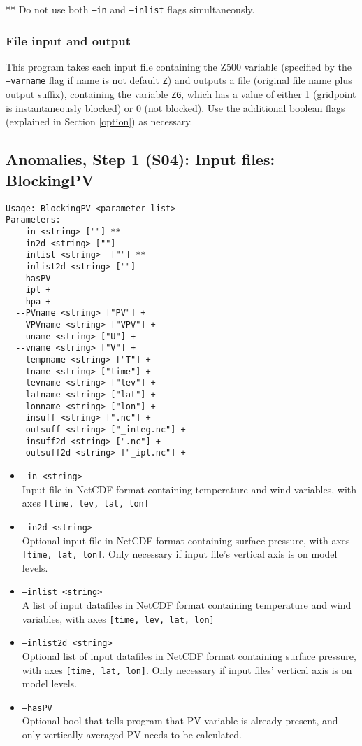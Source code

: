 \documentclass{article}
\begin{document}
** Do not use both \texttt{--in} and \texttt{--inlist} flags simultaneously.


\subsubsection{File input and output}


This program takes each input file containing the Z500 variable (specified by the \texttt{--varname} flag if name is not default \texttt{Z}) and outputs a file (original file name plus output suffix), containing the variable \texttt{ZG}, which has a value of either 1 (gridpoint is instantaneously blocked) or 0 (not blocked). Use the additional boolean flags (explained in Section \ref{option}) as necessary.





\subsection{Anomalies, Step 1 (S04): Input files: BlockingPV}\label{PV}
\begin{verbatim}
Usage: BlockingPV <parameter list>
Parameters:
  --in <string> [""] **
  --in2d <string> [""] 
  --inlist <string>  [""] **
  --inlist2d <string> [""] 
  --hasPV
  --ipl +
  --hpa +
  --PVname <string> ["PV"] +
  --VPVname <string> ["VPV"] +
  --uname <string> ["U"] +
  --vname <string> ["V"] +
  --tempname <string> ["T"] +
  --tname <string> ["time"] +
  --levname <string> ["lev"] +
  --latname <string> ["lat"] +
  --lonname <string> ["lon"] +
  --insuff <string> [".nc"] +
  --outsuff <string> ["_integ.nc"] +
  --insuff2d <string> [".nc"] +
  --outsuff2d <string> ["_ipl.nc"] +
\end{verbatim}



\begin{itemize}
\item[]\texttt{--in <string>} \\ Input file in NetCDF format containing temperature and wind variables, with axes \texttt{[time, lev, lat, lon]}
\item[]\texttt{--in2d <string>} \\ Optional input file in NetCDF format containing surface pressure, with axes \texttt{[time, lat, lon]}. Only necessary if input file's vertical axis is on model levels.
\item[]\texttt{--inlist <string>} \\ A list of input datafiles in NetCDF format containing temperature and wind variables, with axes \texttt{[time, lev, lat, lon]}
\item[]\texttt{--inlist2d <string>} \\ Optional list of input datafiles in NetCDF format containing surface pressure, with axes \texttt{[time, lat, lon]}. Only necessary if input files' vertical axis is on model levels.
\item[]\texttt{--hasPV} \\ Optional bool that tells program that PV variable is already present, and only vertically averaged PV needs to be calculated.
\end{itemize}
\end{document}
